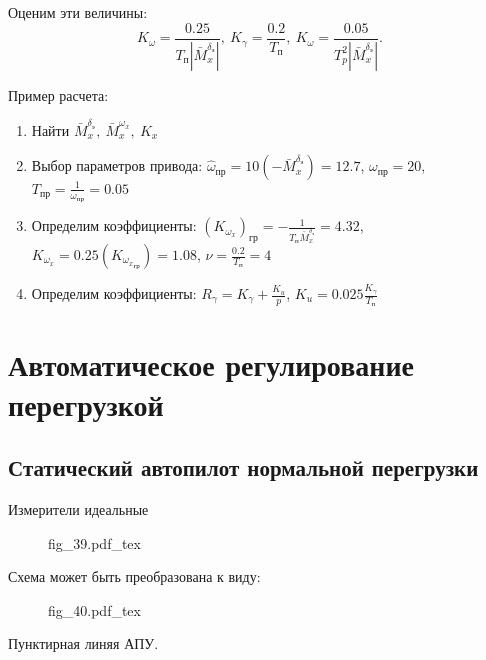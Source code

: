 \documentclass{article}
\begin{document}
Оценим эти величины:
\[
	K_\omega =\frac{0.25}{T_\text{п}|\bar{M}_x^{\delta_\text{э}}|},\ K_\gamma =
	\frac{0.2}{T_\text{п}},\ K_\omega =\frac{0.05}{T_p^2
	|\bar{M}_x^{\delta_\text{э}}|}.
\]

Пример расчета:
\begin{enumerate}
	\item Найти $\bar{M}_x ^{\delta_\text{э}},\ \bar{M}_x^{\omega_x},\ K_x$
	\item Выбор параметров привода:
	      $\hat{\omega}_\text{пр} = 10(-\bar{M}_x^{\delta_\text{э}}) =  12.7$,
	      $\omega_\text{пр} = 20$, $T_\text{пр} = \frac{1}{\omega_\text{пр}} =
		      0.05$
	\item Определим коэффициенты:
	      $(K_{\omega_x})_\text{гр} = -\frac{1}{T_\text{п}
		      \bar{M}_x^{\delta_\text{э}}}=4.32$, $K_{\omega_x} = 0.25
		      (K_{{\omega_x}_\text{гр}}) = 1.08$, $\nu =\frac{0.2}{T_\text{п}}=4$
	\item Определим коэффициенты: $R_\gamma = K_\gamma +\frac{K_u}{p}$, $K_u =
		      0.025 \frac{K_\gamma}{T_\text{п}}$
\end{enumerate}

\section{Автоматическое регулирование перегрузкой}
\subsection{Статический автопилот нормальной перегрузки}
Измерители идеальные
\begin{figure}[H]
	\centering
	{fig_39.pdf_tex}
\end{figure}

Схема может быть преобразована к виду:

\begin{figure}[H]
	\centering
	{fig_40.pdf_tex}
\end{figure}

Пунктирная линяя АПУ.
\end{document}
